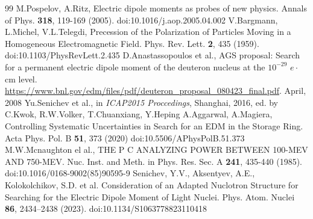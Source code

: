 \documentclass[submitting]{nst}
\begin{document}
\begin{thebibliography} {99}
	 M.Pospelov, A.Ritz, Electric dipole moments as probes of new physics. Annals of Phys. \textbf{318}, 119-169 (2005). doi:10.1016/j.aop.2005.04.002
	 V.Bargmann, L.Michel, V.L.Telegdi, Precession of the Polarization of Particles Moving in a Homogeneous Electromagnetic Field. Phys. Rev. Lett. \textbf{2}, 435 (1959). doi:10.1103/PhysRevLett.2.435
	 D.Anastassopoulos et al., AGS proposal: Search for a permanent electric dipole moment of the deuteron nucleus at the $10^{-29}$ $e\cdot$cm level. \url{https://www.bnl.gov/edm/files/pdf/deuteron_proposal_080423_final.pdf}. April, 2008
	 Yu.Senichev et al., in \textit{ICAP2015 Proccedings}, Shanghai, 2016, ed. by C.Kwok, R.W.Volker, T.Chuanxiang, Y.Heping
	 A.Aggarwal, A.Magiera, Controlling Systematic Uncertainties in Search for an EDM in the Storage Ring. Acta Phys. Pol. B \textbf{51}, 373 (2020) doi:10.5506/APhysPolB.51.373
	 M.W.Mcnaughton el al., THE P C ANALYZING POWER BETWEEN 100-MEV AND 750-MEV. Nuc. Inst. and Meth. in Phys. Res. Sec. A \textbf{241}, 435-440 (1985). doi:10.1016/0168-9002(85)90595-9
	 Senichev, Y.V., Aksentyev, A.E., Kolokolchikov, S.D. et al. Consideration of an Adapted Nuclotron Structure for Searching for the Electric Dipole Moment of Light Nuclei. Phys. Atom. Nuclei \textbf{86}, 2434–2438 (2023). doi:10.1134/S1063778823110418
	

\end{thebibliography}
\end{document}
